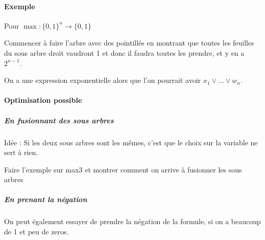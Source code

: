 \paragraph{Exemple} Pour $\max : \{0,1\}^n \to \{0,1\}$
\begin{com}
	Commencer à faire l'arbre avec des pointillés en montrant que toutes les feuilles du sous arbre droit vaudront 1 et donc il faudra toutes les prendre, et y en a $2^{n-1}$.
\end{com}
On a une expression exponentielle alors que l'on pourrait avoir $x_1 \vee \dots \vee w_n$.


\paragraph{Optimisation possible}

\subparagraph{En fusionnant des sous arbres}
Idée : Si les deux sous arbres sont les mêmes, c'est que le choix sur la variable ne sert à rien.

\begin{com}
	Faire l'exemple sur max3 et montrer comment on arrive à fusionner les sous arbres
\end{com}

\subparagraph{En prenant la négation}

On peut également essayer de prendre la négation de la formule, si on a beaucoup de 1 et peu de zeros.

